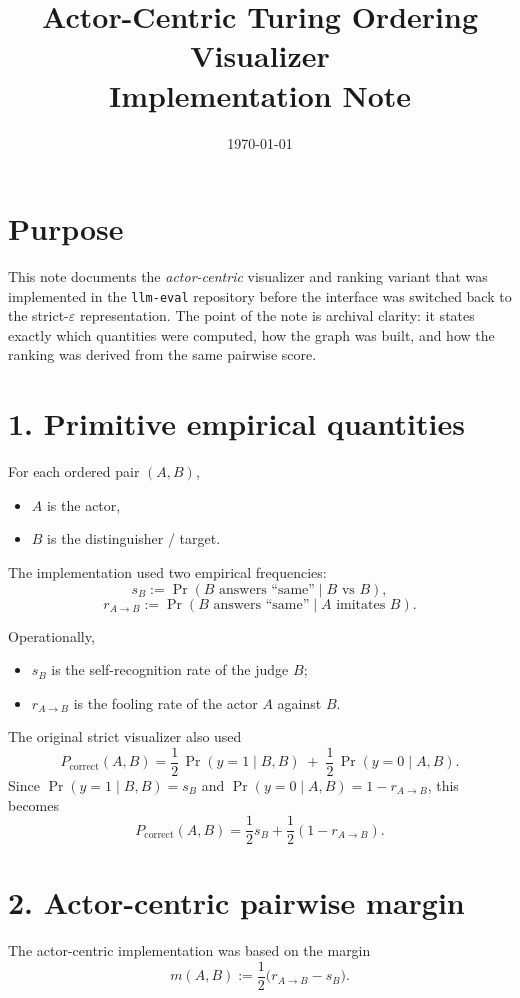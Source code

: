 \documentclass[11pt]{article}
\title{Actor-Centric Turing Ordering Visualizer\\Implementation Note}
\author{}
\date{\today}
\begin{document}
\maketitle

\section*{Purpose}
This note documents the \emph{actor-centric} visualizer and ranking variant that was implemented in the \texttt{llm-eval} repository before the interface was switched back to the strict-\(\varepsilon\) representation. The point of the note is archival clarity: it states exactly which quantities were computed, how the graph was built, and how the ranking was derived from the same pairwise score.

\section*{1. Primitive empirical quantities}
For each ordered pair \((A,B)\),
\begin{itemize}
  \item \(A\) is the actor,
  \item \(B\) is the distinguisher / target.
\end{itemize}

The implementation used two empirical frequencies:
\[
s_B := \Pr(\text{\(B\) answers ``same''} \mid B \text{ vs } B),
\]
\[
r_{A\to B} := \Pr(\text{\(B\) answers ``same''} \mid A \text{ imitates } B).
\]

Operationally,
\begin{itemize}
  \item \(s_B\) is the self-recognition rate of the judge \(B\);
  \item \(r_{A\to B}\) is the fooling rate of the actor \(A\) against \(B\).
\end{itemize}

The original strict visualizer also used
\[
P_{\mathrm{correct}}(A,B)
=
\frac12\,\Pr(y=1\mid B,B)
\;+\;
\frac12\,\Pr(y=0\mid A,B).
\]
Since \(\Pr(y=1\mid B,B)=s_B\) and \(\Pr(y=0\mid A,B)=1-r_{A\to B}\), this becomes
\[
P_{\mathrm{correct}}(A,B)=\frac12 s_B + \frac12(1-r_{A\to B}).
\]

\section*{2. Actor-centric pairwise margin}
The actor-centric implementation was based on the margin
\[
m(A,B)
:=
\frac12\bigl(r_{A\to B}-s_B\bigr).
\]
\end{document}
